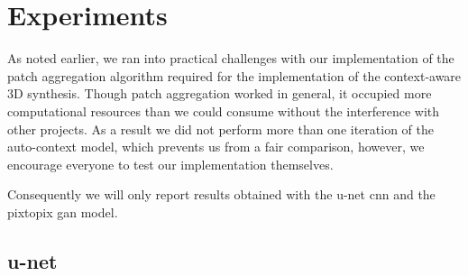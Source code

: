 \section{Experiments}

As noted earlier, we ran into practical challenges with our implementation of
the patch aggregation algorithm required for the implementation of the
context-aware 3D synthesis. Though patch aggregation worked in general, it
occupied more computational resources than we could consume without the
interference with other projects. As a result we did not perform more than one
iteration of the auto-context model, which prevents us from a fair comparison,
however, we encourage everyone to test our implementation themselves.

Consequently we will only report results obtained with the u-net \gls{cnn} and
the pixtopix \gls{gan} model.

\subsection{u-net}

